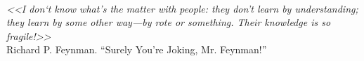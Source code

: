 \begin{flushright}
\textit{%
\\<<I don`t know what's the matter with people: they don't learn by understanding; they learn by some other way---by rote or something. Their knowledge is so fragile!>>\\}
Richard P. Feynman. ``Surely You're Joking, Mr. Feynman!''
\end{flushright}

